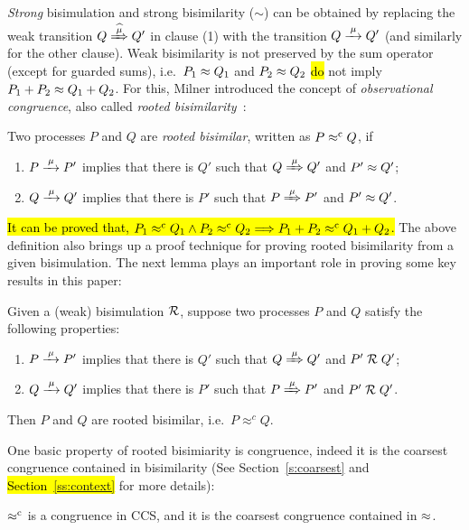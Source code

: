 \emph{Strong} bisimulation and strong bisimilarity ($\sim$)
can be obtained by replacing the weak transition $Q\Arcap\mu Q'$ in 
clause (1) 
 with the transition $Q \arr \mu Q'$ (and similarly for the other clause).
Weak bisimilarity is not preserved by the sum operator (except for
guarded sums), i.e.~$P_1 \approx Q_1$ and $P_2 \approx Q_2$  \hl{do} not imply
 $P_1 + P_2 \approx Q_1 + Q_2$.
For this, Milner introduced the concept of \emph{observational congruence}, also called \emph{rooted
  bisimilarity}~\cite{Gorrieri:2015jt,Sangiorgi:2011ut}:
\begin{definition}%
\label{d:rootedBisimilarity}
Two processes $P$ and $Q$ are \emph{rooted bisimilar}, written as $P
\mathrel{\approx^{\rm{c}}} Q$, if %
\begin{enumerate}
 \item  $P \arr\mu P'$ implies that there is $Q'$ such that $Q
   \Arr\mu Q'$ and $P' \approx Q'$;
 \item  $Q \arr\mu Q'$ implies that there is $P'$ such that $P
   \Arr\mu P'$ and $P' \approx Q'$\enspace.
\end{enumerate}
\end{definition}
\hl{It can be proved that, $P_1 \mathrel{\approx^{\rm{c}}} Q_1 \wedge P_2 \mathrel{\approx^{\rm{c}}} Q_2 \Longrightarrow
P_1 + P_2 \mathrel{\approx^{\rm{c}}} Q_1 + Q_2$.}
The above definition also brings up a proof technique for proving rooted
bisimilarity from a given bisimulation. The next
lemma plays an
important role in proving some key results in this paper:
\begin{lemma}
\label{l:obsCongrByWeakBisim}
Given a (weak) bisimulation $\mathrel{\cal R}$, suppose two processes $P$ and $Q$
satisfy the following properties:
\begin{enumerate}
\item $P \arr\mu P'$ implies that there is $Q'$ such that $Q
   \Arr\mu Q'$ and $P' \mathrel{\cal R} Q'$;
\item $Q \arr\mu Q'$ implies that there is $P'$ such that $P
   \Arr\mu P'$ and $P' \mathrel{\cal R} Q'$.
\end{enumerate}
Then $P$ and $Q$ are rooted bisimilar, i.e.~$P \approx^c Q$.
\end{lemma}

One basic property of rooted bisimiarity is congruence,
indeed it is  the coarsest congruence contained in bisimilarity
(See Section~\ref{s:coarsest} and \hl{\mbox{Section~\ref{ss:context}}} for more details):
\begin{theorem}
\label{t:rapproxCongruence}
$\mathrel{\approx^{\rm{c}}}$ is a congruence in CCS, and it is the
coarsest congruence contained in $\approx$.
\end{theorem}

